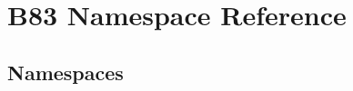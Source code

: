 \hypertarget{namespace_b83}{}\section{B83 Namespace Reference}
\label{namespace_b83}
\subsection*{Namespaces}
\begin{DoxyCompactItemize}
\end{DoxyCompactItemize}

